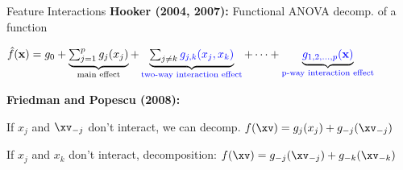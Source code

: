 \documentclass[10pt,compress,t,notes=noshow,xcolor=table]{beamer}
\newcommand{\highlight}[1]{\colorbox{orange}{$\displaystyle #1$}}
\begin{document}
\begin{framev}[align=top]{Feature Interactions}
\textbf{Hooker (2004, 2007):} Functional ANOVA decomp. of a function%
\begin{center}
$\textstyle
\hat{f}(\mathbf{x}) = g_0 +
\underbrace{\textstyle\sum_{j=1}^{p} {{g_j(x_j)}}}_{\text{{main effect}}} +
\underbrace{\textstyle\sum_{j \neq k} {\textcolor{blue}{g_{j,k}(x_j, x_k)}}}_{\text{\textcolor{blue}{two-way interaction effect}}} +
\cdots +
\underbrace{{\textcolor{blue}{g_{1,2,\ldots,p}(\mathbf{x})}}}_{\text{\textcolor{blue}{p-way interaction effect}}}
$
\end{center}
\textbf{Friedman and Popescu (2008):} %
\begin{itemizeM}
\item[$\Rightarrow$]
If $x_j$ and $\xv_{-j}$ don't interact, we can decomp. $f(\xv) = g_{j}(x_{j}) + g_{-j}(\xv_{-j})$\\
\item[$\Rightarrow$]
If $x_j$ and $x_k$ don't interact, decomposition: $f(\xv) = g_{-j}(\xv_{-j}) + g_{-k}(\xv_{-k})$
\end{itemizeM}




\end{framev}
\end{document}
